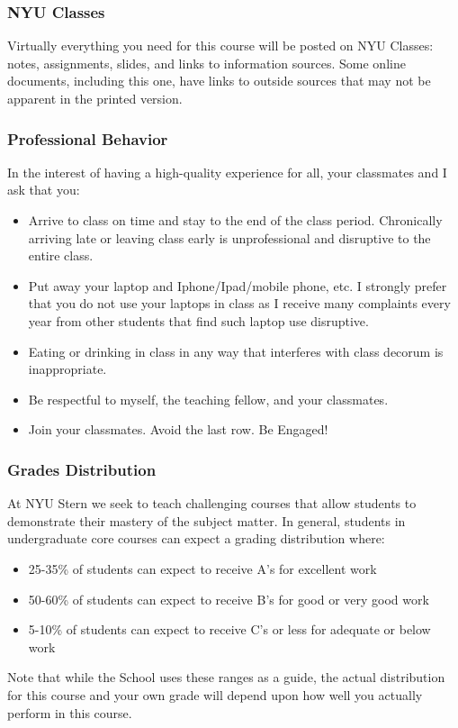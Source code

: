 \documentclass[12pt,pdftex,twoside,letterpaper]{exam}
\begin{document}
\subsubsection*{NYU Classes}
Virtually everything you need for this course will be posted on NYU Classes:
notes, assignments, slides, and links to information sources. Some online documents, including this one, have links to outside sources that may not be apparent in the printed version.

\subsubsection*{Professional Behavior}
In the interest of having a high-quality experience for all,
your classmates and I ask that you:
\begin{itemize}
\item Arrive to class on time and stay to the end of the class period. Chronically arriving late or leaving class early is unprofessional and disruptive to the entire class.

\item Put away your laptop and Iphone/Ipad/mobile phone, etc. I strongly prefer that you do not use your laptops in class as I receive many complaints every year from other students that find such laptop use disruptive.

\item Eating or drinking in class in any way that interferes with class decorum is inappropriate.

\item Be respectful to myself, the teaching fellow, and your classmates.

\item Join your classmates. Avoid the last row. Be Engaged!
\end{itemize}

\subsubsection*{Grades Distribution}
At NYU Stern we seek to teach challenging courses that allow students to demonstrate their mastery of the subject matter.  In general, students in undergraduate core courses can expect a grading distribution where:
\begin{itemize}
\item 25-35\% of students can expect to receive A's for excellent work
\item 50-60\% of students can expect to receive B's for good or very good work
\item 5-10\% of students can expect to receive C's or less for adequate or below work
\end{itemize}
Note that while the School uses these ranges as a guide, the actual distribution for this course and your own grade will depend upon how well you actually perform in this course.
\end{document}
